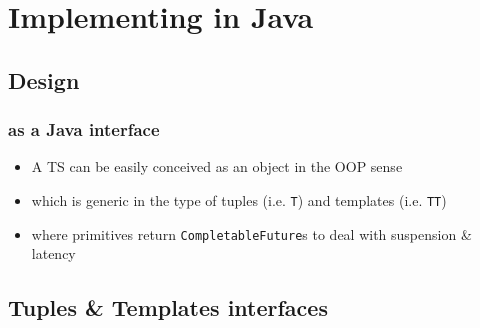 \documentclass[presentation]{beamer}\mode<presentation>{\usetheme{AMSCesenaPurpleAndGold}}
\begin{document}
\section{Implementing \linda{} in Java}

\subsection{Design} 

\begin{frame}%
\frametitle{\linda{} as a Java interface}

\begin{itemize}
	\item A TS can be easily conceived as an \alert{object} in the OOP sense
	
	\vfill
	
	\item which is generic in the type of tuples (i.e. \texttt{\alert{T}}) and templates (i.e. \texttt{\alert{TT}})
	
	\vfill
	
	\item where primitives return \alert{\texttt{CompletableFuture}s} to deal with suspension \& latency
\end{itemize}

\vfill


\end{frame}

\subsection{Tuples \& Templates interfaces} 
\end{document}
